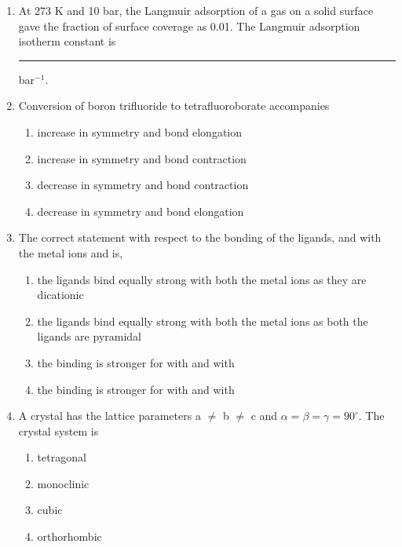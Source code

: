 \documentclass[journal,12pt,onecolumn]{IEEEtran}
\theoremstyle{remark}
\begin{document}
\begin{enumerate}
\item At 273 K and 10 bar, the Langmuir adsorption of a gas on a solid surface gave the fraction of surface coverage as 0.01. The Langmuir adsorption isotherm constant is \rule{1cm}{0.15mm} bar$^{-1}$. 
\hfill{}



\item Conversion of boron trifluoride to tetrafluoroborate accompanies
    \begin{enumerate}
        \item increase in symmetry and bond elongation
        \item increase in symmetry and bond contraction
        \item decrease in symmetry and bond contraction
        \item decrease in symmetry and bond elongation
        \hfill{}
    \end{enumerate}



\item The correct statement with respect to the bonding of the ligands,  and  with the metal ions  and  is,
    \begin{enumerate}
        \item the ligands bind equally strong with both the metal ions as they are dicationic
        \item the ligands bind equally strong with both the metal ions as both the ligands are pyramidal
        \item the binding is stronger for  with  and  with 
        \item the binding is stronger for  with  and  with 
        \hfill{}
    \end{enumerate}
\item A crystal has the lattice parameters a $\neq$ b $\neq$ c and $\alpha = \beta = \gamma = 90^{\circ}$. The crystal system is
\begin{enumerate}
    \item tetragonal
    \item monoclinic
    \item cubic
    \item orthorhombic
\end{enumerate}
\hfill \textbf{}


\end{enumerate}
\end{document}

